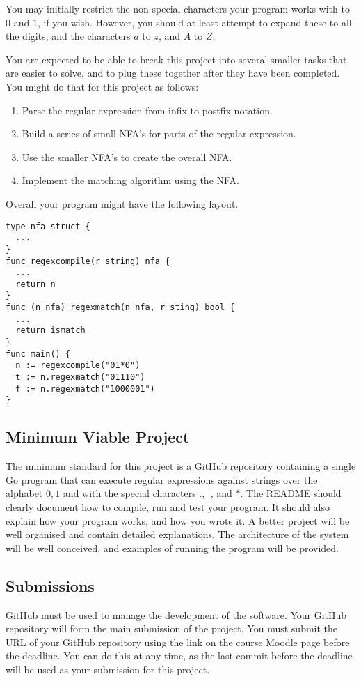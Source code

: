 \documentclass[12pt, a4paper]{article}
\begin{document}
You may initially restrict the non-special characters your program works with to $0$ and $1$, if you wish.
However, you should at least attempt to expand these to all the digits, and the characters $a$ to $z$, and $A$ to $Z$.

You are expected to be able to break this project into several smaller tasks that are easier to solve, and to plug these together after they have been completed.
You might do that for this project as follows:
\begin{enumerate}
  \item Parse the regular expression from infix to postfix notation.
  \item Build a series of small NFA's for parts of the regular expression.
  \item Use the smaller NFA's to create the overall NFA.
  \item Implement the matching algorithm using the NFA.
\end{enumerate}
Overall your program might have the following layout.

\begin{verbatim}
type nfa struct {
  ...
}
func regexcompile(r string) nfa {
  ...
  return n
}
func (n nfa) regexmatch(n nfa, r sting) bool {
  ...
  return ismatch
}
func main() {
  n := regexcompile("01*0")
  t := n.regexmatch("01110")
  f := n.regexmatch("1000001")
}
\end{verbatim}


\subsection*{Minimum Viable Project}
The minimum standard for this project is a GitHub repository containing a single Go program that can execute regular expressions against strings over the alphabet ${0,1}$ and with the special characters $.$, $|$, and $*$.
The README should clearly document how to compile, run and test your program.
It should also explain how your program works, and how you wrote it.
A better project will be well organised and contain detailed explanations.
The architecture of the system will be well conceived, and examples of running the program will be provided.


\subsection*{Submissions}
GitHub must be used to manage the development of the software.
Your GitHub repository will form the main submission of the project.
You must submit the URL of your GitHub repository using the link on the course Moodle page before the deadline.
You can do this at any time, as the last commit before the deadline will be used as your submission for this project.
\end{document}

